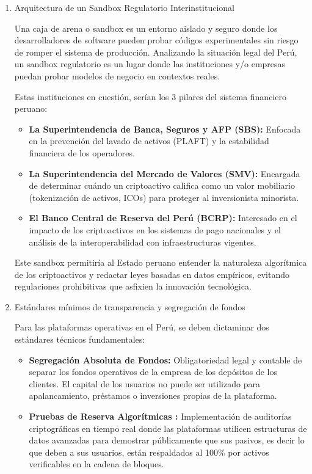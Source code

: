 \documentclass[12pt,a4paper]{article}
\begin{document}
\begin{enumerate}[label=\alph*.]
  \item Arquitectura de un Sandbox Regulatorio Interinstitucional

Una caja de arena o sandbox es un entorno aislado y seguro donde los desarrolladores de software pueden probar códigos experimentales sin riesgo de romper el sistema de producción. Analizando la situación legal del Perú, un sandbox regulatorio es un lugar donde las instituciones y/o empresas puedan probar modelos de negocio en contextos reales.

Estas instituciones en cuestión, serían los 3 pilares del sistema financiero peruano:

\begin{itemize}
  \item \textbf{La Superintendencia de Banca, Seguros y AFP (SBS):} Enfocada en la prevención del lavado de activos (PLAFT) y la estabilidad financiera de los operadores.
  \item \textbf{La Superintendencia del Mercado de Valores (SMV):} Encargada de determinar cuándo un criptoactivo califica como un valor mobiliario (tokenización de activos, ICOs) para proteger al inversionista minorista.
  \item \textbf{El Banco Central de Reserva del Perú (BCRP):} Interesado en el impacto de los criptoactivos en los sistemas de pago nacionales y el análisis de la interoperabilidad con infraestructuras vigentes.
\end{itemize}

Este sandbox permitiría al Estado peruano entender la naturaleza algorítmica de los criptoactivos y redactar leyes basadas en datos empíricos, evitando regulaciones prohibitivas que asfixien la innovación tecnológica.

  \item Estándares mínimos de transparencia y segregación de fondos

Para las plataformas operativas en el Perú, se deben dictaminar dos estándares técnicos fundamentales:

\begin{itemize}
  \item \textbf{Segregación Absoluta de Fondos:} Obligatoriedad legal y contable de separar los fondos operativos de la empresa de los depósitos de los clientes. El capital de los usuarios no puede ser utilizado para apalancamiento, préstamos o inversiones propias de la plataforma.
  \item \textbf{Pruebas de Reserva Algorítmicas :} Implementación de auditorías criptográficas en tiempo real donde las plataformas utilicen estructuras de datos avanzadas para demostrar públicamente que sus pasivos, es decir lo que deben a sus usuarios, están respaldados al 100\% por activos verificables en la cadena de bloques.
\end{itemize}
\end{enumerate}
\end{document}
